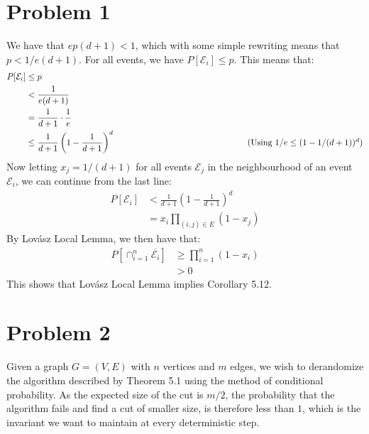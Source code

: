 \documentclass[a4paper, fleqn]{article}
\newcommand{\comment}[1]{%
  \text{\phantom{(#1)}} \tag{#1}}
\begin{document}
\section*{Problem 1}
We have that $ep(d+1) < 1$, which with some simple rewriting means that $p<1/e(d+1)$. For all events, we have $P[\mathcal{E}_i]\leq p$. This means that:
\begin{align*}
  P[\mathcal{E}_i] &\leq p \\
  &< \frac{1}{e(d+1)} \\
  &= \frac{1}{d+1}\cdot \frac{1}{e} \\
  &\leq \frac{1}{d+1}\left(1-\frac{1}{d+1}\right)^d \comment{Using $1/e\leq (1-1/(d+1))^d$} \\
\end{align*}
Now letting $x_j=1/(d+1)$ for all events $\mathcal{E}_j$ in the neighbourhood of an event $\mathcal{E}_i$, we can continue from the last line:
\begin{align*}
  P[\mathcal{E}_i]&< \frac{1}{d+1}\left(1-\frac{1}{d+1}\right)^d \\
                  &= x_i \prod_{(i,j)\in E}(1-x_j)
\end{align*}
By Lovász Local Lemma, we then have that:
\begin{align*}
  P\left[ \cap_{i=1}^n \overline{\mathcal{E}_i} \right] &\geq \prod_{i=1}^n (1-x_i) \\
                                                        &> 0
\end{align*}
This shows that Lovász Local Lemma implies Corollary 5.12.

\section*{Problem 2}
Given a graph $G=(V,E)$ with $n$ vertices and $m$ edges, we wish to derandomize the algorithm described by Theorem 5.1 using the method of conditional probability. As the expected size of the cut is $m/2$, the probability that the algorithm fails and find a cut of smaller size, is therefore less than $1$, which is the invariant we want to maintain at every deterministic step.
\end{document}
